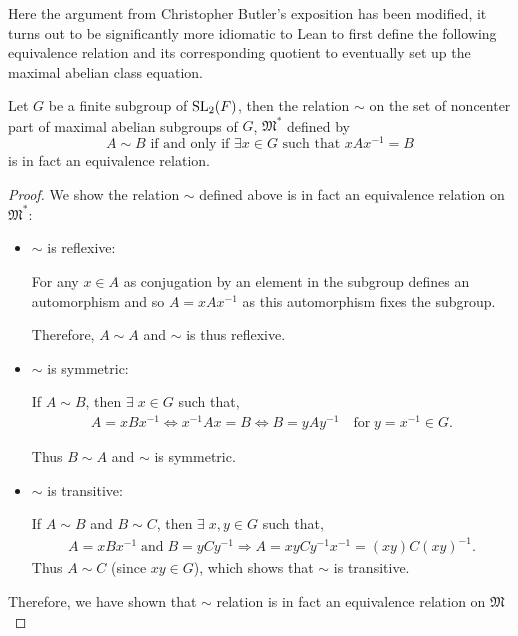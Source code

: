 Here the argument from Christopher Butler's exposition has been modified, it turns out to be significantly more
idiomatic to Lean to first define the following equivalence relation and its corresponding quotient to eventually set up
the maximal abelian class equation.

\begin{lemma}
\label{lift_noncenter_MaximalAbelianSubgroupsOf}
\leanok
 Let $G$ be a finite subgroup of $\operatorname{SL}_2(F)$, then the relation $\sim$ on the set of noncenter part of maximal abelian subgroups of $G$, $\mathfrak{M}^*$ defined by
 \[
 A \sim B \text{ if and only if } \exists x \in G \text{ such that } x A x^{-1} = B
 \]
 is in fact an equivalence relation.
\end{lemma}

\begin{proof}
 We show the relation $\sim$ defined above is in fact an equivalence relation on  $\mathfrak{M}^*$:
\begin{itemize}
\item $\sim$ is reflexive:

For any $x \in A$ as conjugation by an element in the subgroup defines an automorphism and so $A = x A x^{-1}$ as this automorphism fixes the subgroup.

Therefore, $A \sim A$ and $\sim$ is thus reflexive.

\item $\sim$ is symmetric:

If $A \sim B$, then $\exists \; x \in G$ such that,
\begin{align*}
  A = xBx^{-1} \iff x^{-1}Ax = B \iff B = yAy^{-1} \quad \text{for} \; y = x^{-1} \in G.
\end{align*}

Thus $B \sim A$ and $\sim$ is symmetric.\\

\item $\sim$ is transitive:

If $A \sim B$ and $B \sim C$, then $\exists \; x, y \in G$  such that,
\begin{align*} A = xBx^{-1} \; \text{and} \; B = yCy^{-1} \Rightarrow A = xyCy^{-1}x^{-1} = (xy)C(xy)^{-1}.
\end{align*}
Thus $A \sim C$ (since $xy \in G$), which shows that $\sim$ is transitive. \\
\end{itemize}

Therefore, we have shown that $\sim$ relation is in fact an equivalence relation on $\mathfrak{M}$
\end{proof}

